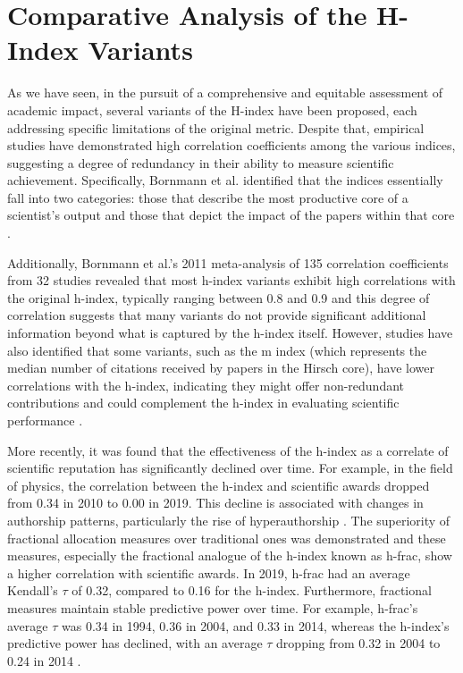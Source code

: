 \section{Comparative Analysis of the H-Index Variants}
As we have seen, in the pursuit of a comprehensive and equitable assessment of
academic impact, several variants of the H-index have been proposed, each
addressing specific limitations of the original metric. Despite that, empirical
studies have demonstrated high correlation coefficients among the various
indices, suggesting a degree of redundancy in their ability to measure
scientific achievement. Specifically, Bornmann et al. identified that the
indices essentially fall into two categories: those that describe the most
productive core of a scientist’s output and those that depict the impact of the
papers within that core \cite{bornmann2008are, bornmann2011multilevel}.

Additionally, Bornmann et al.'s 2011 meta-analysis of 135 correlation
coefficients from 32 studies revealed that most h-index variants exhibit high
correlations with the original h-index, typically ranging between 0.8 and 0.9
and this degree of correlation suggests that many variants do not provide
significant additional information beyond what is captured by the h-index
itself. However, studies have also identified that some variants, such as the m
index (which represents the median number of citations received by papers in
the Hirsch core), have lower correlations with the h-index, indicating they
might offer non-redundant contributions and could complement the h-index in
evaluating scientific performance \cite{bornmann2011multilevel,
    bornmann2008are}.

More recently, it was found that the effectiveness of the h-index as a
correlate of scientific reputation has significantly declined over time. For
example, in the field of physics, the correlation between the h-index and
scientific awards dropped from 0.34 in 2010 to 0.00 in 2019. This decline is
associated with changes in authorship patterns, particularly the rise of
hyperauthorship \cite{koltun2021h}. The superiority of fractional allocation
measures over traditional ones was demonstrated and these measures, especially
the fractional analogue of the h-index known as h-frac, show a higher
correlation with scientific awards. In 2019, h-frac had an average Kendall’s
$\tau$ of 0.32, compared to 0.16 for the h-index. Furthermore, fractional
measures maintain stable predictive power over time. For example, h-frac's
average $\tau$ was 0.34 in 1994, 0.36 in 2004, and 0.33 in 2014, whereas the
h-index's predictive power has declined, with an average $\tau$ dropping from
0.32 in 2004 to 0.24 in 2014 \cite{koltun2021h}.

